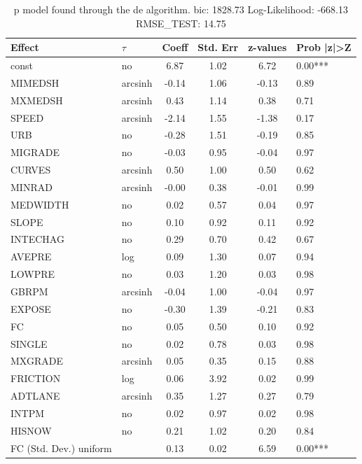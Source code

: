 \begin{table}
	\caption{p model found through the de algorithm. bic: 1828.73 Log-Likelihood: -668.13 RMSE_TEST: 14.75}
	\begin{center}
		\begin{tabular}{|l|l|c|c|c|l|}
			\hline
			Effect & $\tau$ & Coeff & Std. Err & z-values & Prob |z|>Z \\
			\hline
			const & no & 6.87 & 1.02 & 6.72 & 0.00*** \\
			\hline
			MIMEDSH & arcsinh & -0.14 & 1.06 & -0.13 & 0.89 \\
			\hline
			MXMEDSH & arcsinh & 0.43 & 1.14 & 0.38 & 0.71 \\
			\hline
			SPEED & arcsinh & -2.14 & 1.55 & -1.38 & 0.17 \\
			\hline
			URB & no & -0.28 & 1.51 & -0.19 & 0.85 \\
			\hline
			MIGRADE & no & -0.03 & 0.95 & -0.04 & 0.97 \\
			\hline
			CURVES & arcsinh & 0.50 & 1.00 & 0.50 & 0.62 \\
			\hline
			MINRAD & arcsinh & -0.00 & 0.38 & -0.01 & 0.99 \\
			\hline
			MEDWIDTH & no & 0.02 & 0.57 & 0.04 & 0.97 \\
			\hline
			SLOPE & no & 0.10 & 0.92 & 0.11 & 0.92 \\
			\hline
			INTECHAG & no & 0.29 & 0.70 & 0.42 & 0.67 \\
			\hline
			AVEPRE & log & 0.09 & 1.30 & 0.07 & 0.94 \\
			\hline
			LOWPRE & no & 0.03 & 1.20 & 0.03 & 0.98 \\
			\hline
			GBRPM & arcsinh & -0.04 & 1.00 & -0.04 & 0.97 \\
			\hline
			EXPOSE & no & -0.30 & 1.39 & -0.21 & 0.83 \\
			\hline
			FC & no & 0.05 & 0.50 & 0.10 & 0.92 \\
			\hline
			SINGLE & no & 0.02 & 0.78 & 0.03 & 0.98 \\
			\hline
			MXGRADE & arcsinh & 0.05 & 0.35 & 0.15 & 0.88 \\
			\hline
			FRICTION & log & 0.06 & 3.92 & 0.02 & 0.99 \\
			\hline
			ADTLANE & arcsinh & 0.35 & 1.27 & 0.27 & 0.79 \\
			\hline
			INTPM & no & 0.02 & 0.97 & 0.02 & 0.98 \\
			\hline
			HISNOW & no & 0.21 & 1.02 & 0.20 & 0.84 \\
			\hline
			FC (Std. Dev.) uniform &  & 0.13 & 0.02 & 6.59 & 0.00*** \\

\end{tabular}
\end{center}
\end{table}
